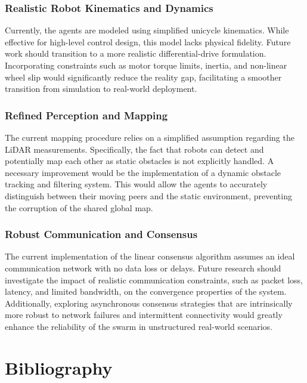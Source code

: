 \documentclass[times, twoside]{zHenriquesLab-StyleBioRxiv}
\begin{document}
\subsubsection*{Realistic Robot Kinematics and Dynamics}
Currently, the agents are modeled using simplified unicycle kinematics. While effective for high-level control design, this model lacks physical fidelity. Future work should transition to a more realistic differential-drive formulation. Incorporating constraints such as motor torque limits, inertia, and non-linear wheel slip would significantly reduce the reality gap, facilitating a smoother transition from simulation to real-world deployment.

\subsubsection*{Refined Perception and Mapping}
The current mapping procedure relies on a simplified assumption regarding the LiDAR measurements. Specifically, the fact that robots can detect and potentially map each other as static obstacles is not explicitly handled. A necessary improvement would be the implementation of a dynamic obstacle tracking and filtering system. This would allow the agents to accurately distinguish between their moving peers and the static environment, preventing the corruption of the shared global map.

\subsubsection*{Robust Communication and Consensus}
The current implementation of the linear consensus algorithm assumes an ideal communication network with no data loss or delays. Future research should investigate the impact of realistic communication constraints, such as packet loss, latency, and limited bandwidth, on the convergence properties of the system. Additionally, exploring asynchronous consensus strategies that are intrinsically more robust to network failures and intermittent connectivity would greatly enhance the reliability of the swarm in unstructured real-world scenarios.


\section*{Bibliography}

\end{document}

